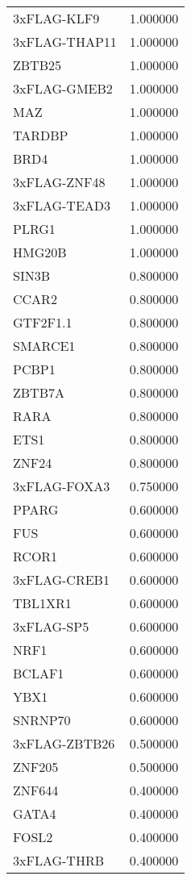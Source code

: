 \begin{longtable}{lr}
     3xFLAG-KLF9 &  1.000000 \\
   3xFLAG-THAP11 &  1.000000 \\
          ZBTB25 &  1.000000 \\
    3xFLAG-GMEB2 &  1.000000 \\
             MAZ &  1.000000 \\
          TARDBP &  1.000000 \\
            BRD4 &  1.000000 \\
    3xFLAG-ZNF48 &  1.000000 \\
    3xFLAG-TEAD3 &  1.000000 \\
           PLRG1 &  1.000000 \\
          HMG20B &  1.000000 \\
           SIN3B &  0.800000 \\
           CCAR2 &  0.800000 \\
        GTF2F1.1 &  0.800000 \\
         SMARCE1 &  0.800000 \\
           PCBP1 &  0.800000 \\
          ZBTB7A &  0.800000 \\
            RARA &  0.800000 \\
            ETS1 &  0.800000 \\
           ZNF24 &  0.800000 \\
    3xFLAG-FOXA3 &  0.750000 \\
           PPARG &  0.600000 \\
             FUS &  0.600000 \\
           RCOR1 &  0.600000 \\
    3xFLAG-CREB1 &  0.600000 \\
         TBL1XR1 &  0.600000 \\
      3xFLAG-SP5 &  0.600000 \\
            NRF1 &  0.600000 \\
          BCLAF1 &  0.600000 \\
            YBX1 &  0.600000 \\
         SNRNP70 &  0.600000 \\
   3xFLAG-ZBTB26 &  0.500000 \\
          ZNF205 &  0.500000 \\
          ZNF644 &  0.400000 \\
           GATA4 &  0.400000 \\
           FOSL2 &  0.400000 \\
     3xFLAG-THRB &  0.400000 \\

\end{longtable}
